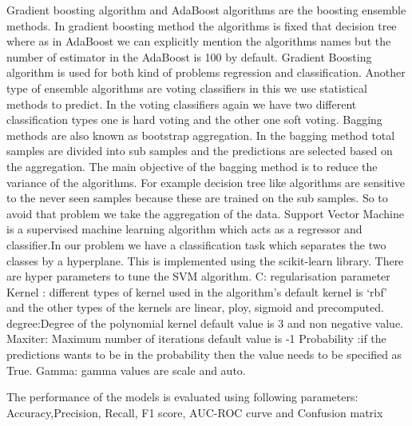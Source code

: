 \documentclass[conference]{IEEEtran}
\begin{document}
Gradient boosting algorithm and AdaBoost algorithms are the boosting ensemble methods. In gradient boosting method the algorithms is fixed that decision tree where as in AdaBoost we can explicitly mention the algorithms names but the number of estimator in the AdaBoost is 100 by default. Gradient Boosting algorithm is used for both kind of problems regression and classification.
Another type of ensemble algorithms are voting classifiers in this we use statistical methods to predict. In the voting classifiers again we have  two different classification types one is hard voting and the other one soft voting.
Bagging methods are also known as bootstrap aggregation. In the bagging method total samples are divided into sub samples and the predictions are selected based on the aggregation. The main objective of the bagging method is to reduce the variance of the algorithms. For example decision tree like algorithms are sensitive to the never seen samples because these are trained on the sub samples. So to avoid that problem we take the aggregation of the data.
Support Vector Machine is a supervised machine learning algorithm which acts as a regressor and classifier.In our problem we have a classification task which separates the two classes by a hyperplane. This is implemented using the scikit-learn library. There are hyper parameters to tune the SVM algorithm.
C: regularisation parameter
Kernel : different types of kernel used in the algorithm's default kernel is ‘rbf’ and the other types of the kernels are linear, ploy, sigmoid and precomputed.
degree:Degree of the polynomial kernel default value is 3 and non negative value.
Maxiter: Maximum number of iterations default value is -1
Probability :if the predictions wants to be in the probability then the value needs to be specified as True.
Gamma: gamma values are scale and auto.

The performance of the models is evaluated using following parameters:
Accuracy,Precision, Recall, F1 score, AUC-ROC curve and Confusion matrix
\end{document}
